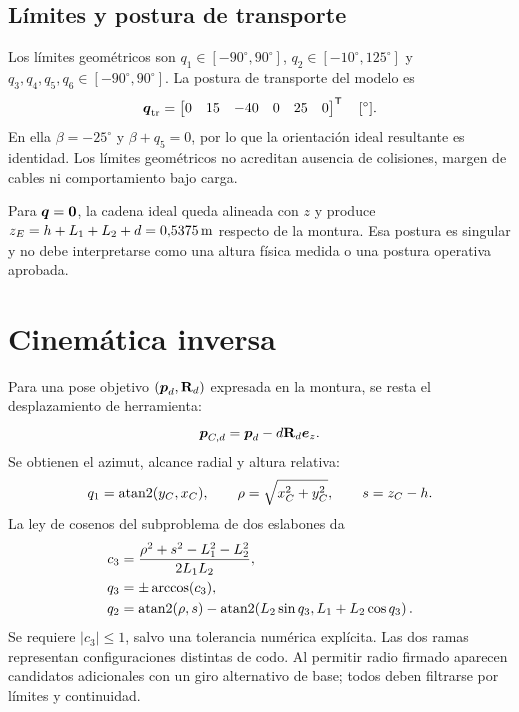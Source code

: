 \subsection{Límites y postura de transporte}
Los límites geométricos son $q_1\in[-90^{\circ},90^{\circ}]$, $q_2\in[-10^{\circ},125^{\circ}]$ y $q_3,q_4,q_5,q_6\in[-90^{\circ},90^{\circ}]$. La postura de transporte del modelo es
\begin{equation}
\boldsymbol{q}_{\mathrm{tr}}=\begin{bmatrix}0&15&-40&0&25&0\end{bmatrix}^{\mathsf{T}}
\quad[^{\circ}].
\end{equation}
En ella $\beta=-25^{\circ}$ y $\beta+q_5=0$, por lo que la orientación ideal resultante es identidad. Los límites geométricos no acreditan ausencia de colisiones, margen de cables ni comportamiento bajo carga.

Para $\boldsymbol{q}=\boldsymbol{0}$, la cadena ideal queda alineada con $z$ y produce $z_E=h+L_1+L_2+d=0{,}5375\,\mathrm{m}$ respecto de la montura. Esa postura es singular y no debe interpretarse como una altura física medida o una postura operativa aprobada.

\section{Cinemática inversa}
Para una pose objetivo $(\boldsymbol{p}_d,\mathbf{R}_d)$ expresada en la montura, se resta el desplazamiento de herramienta:
\begin{equation}
\boldsymbol{p}_{C,d}=\boldsymbol{p}_d-d\mathbf{R}_d\boldsymbol{e}_z.
\end{equation}
Se obtienen el azimut, alcance radial y altura relativa:
\begin{equation}
q_1=\operatorname{atan2}(y_C,x_C),\qquad
\rho=\sqrt{x_C^2+y_C^2},\qquad s=z_C-h.
\end{equation}
La ley de cosenos del subproblema de dos eslabones da
\begin{align}
c_3&=\frac{\rho^2+s^2-L_1^2-L_2^2}{2L_1L_2},\\
q_3&=\pm\arccos(c_3),\\
q_2&=\operatorname{atan2}(\rho,s)-\operatorname{atan2}\!\left(L_2\sin q_3,L_1+L_2\cos q_3\right).
\end{align}
Se requiere $|c_3|\le1$, salvo una tolerancia numérica explícita. Las dos ramas representan configuraciones distintas de codo. Al permitir radio firmado aparecen candidatos adicionales con un giro alternativo de base; todos deben filtrarse por límites y continuidad.

